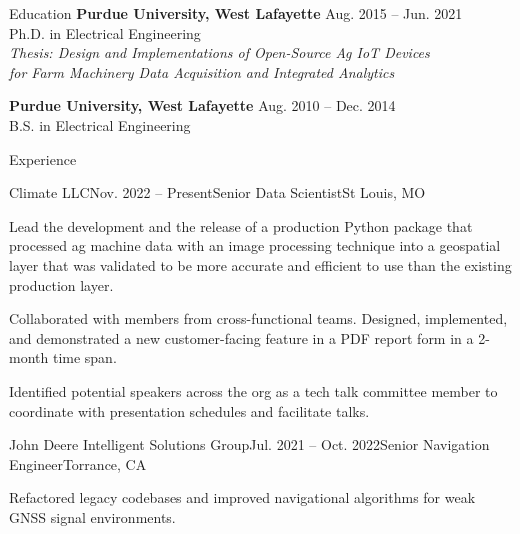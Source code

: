 \documentclass{resume}
\begin{document}
  \begin{rSection}{Education}
    {\bf Purdue University, West Lafayette} \hfill {Aug. 2015 -- Jun. 2021}
    \\ 
    {Ph.D. in Electrical Engineering} \\
    \textit{Thesis: Design and Implementations of Open-Source Ag IoT Devices \\
      for Farm Machinery Data Acquisition and Integrated Analytics}

    {\bf Purdue University, West Lafayette} \hfill {Aug. 2010 -- Dec. 2014}
    \\ 
    {B.S. in Electrical Engineering} \\
  \end{rSection}

  \begin{rSection}{Experience}
    \begin{rSubsection}{Climate LLC}{Nov. 2022 --
      Present}{Senior Data Scientist}{St Louis, MO}
      \item Lead the development and the release of a production Python package
      that processed ag machine data with an image processing technique into a
      geospatial layer that was validated to be more accurate and efficient to
      use than the existing production layer.
      \item Collaborated with members from cross-functional teams. Designed,
      implemented, and demonstrated a new customer-facing feature in a PDF
      report form in a 2-month time span. 
      \item Identified potential speakers across the org as a tech talk
      committee member to coordinate with presentation schedules and facilitate
      talks. 
    \end{rSubsection}

    \begin{rSubsection}{John Deere Intelligent Solutions Group}{Jul. 2021 --
      Oct. 2022}{Senior Navigation Engineer}{Torrance, CA}
      \item Refactored legacy codebases and improved navigational algorithms for
      weak GNSS signal environments. 
    \end{rSubsection}


\end{rSection}
\end{document}
